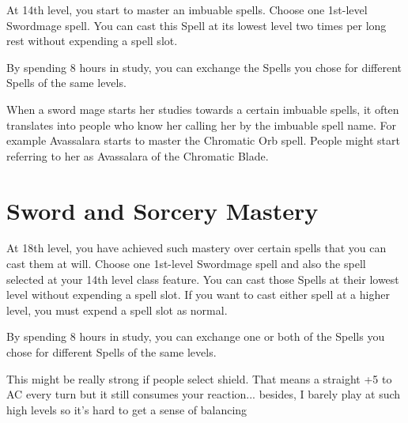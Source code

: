 \begin{multicols*}{2}
At 14th level, you start to master an imbuable spells. Choose one 1st-level Swordmage spell. You can cast this Spell at its lowest level two times per long rest without expending a spell slot. 

By spending 8 hours in study, you can exchange the Spells you chose for different Spells of the same levels.

When a sword mage starts her studies towards a certain imbuable spells, it often translates into people who know her calling her by the imbuable spell name. For example Avassalara starts to master the Chromatic Orb spell. People might start referring to her as Avassalara of the Chromatic Blade.





\section*{Sword and Sorcery Mastery}


At 18th level, you have achieved such mastery over certain spells that you can cast them at will. Choose one 1st-level Swordmage spell and also the spell selected at your 14th level class feature. You can cast those Spells at their lowest level without expending a spell slot. If you want to cast either spell at a higher level, you must expend a spell slot as normal.

By spending 8 hours in study, you can exchange one or both of the Spells you chose for different Spells of the same levels.


\smallskip

{\color{red} This might be really strong if people select shield. That means a straight +5 to AC every turn but it still consumes your reaction... besides, I barely play at such high levels so it's hard to get a sense of balancing }



\end{multicols*}

\clearpage

